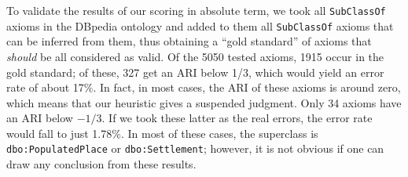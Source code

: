\documentclass{sig-alternate}
\begin{document}

To validate the results of our scoring in absolute term, we took all \texttt{SubClassOf}
axioms in the DBpedia ontology and added to them all \texttt{SubClassOf} axioms
that can be inferred from them, thus obtaining a ``gold standard'' of axioms
that \emph{should} be all considered as valid. 
Of the 5050 tested axioms, 1915 occur in the gold standard; of these, 327 get an
ARI below 1/3, which would yield an error rate of about 17\%.
In fact, in most cases, the ARI of these axioms is around zero, which means that
our heuristic gives a suspended judgment.
Only 34 axioms have an ARI below $-1/3$. If we took these latter as the real errors,
the error rate would fall to just 1.78\%.
In most of these cases, the superclass is \texttt{dbo:PopulatedPlace} or \texttt{dbo:Settlement};
however, it is not obvious if one can draw any conclusion from these results.
\end{document}

